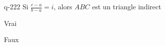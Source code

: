\begin{truefalse}{q-222}
Si $\frac{c-a}{b-a} =i$, alors $ABC$ est un triangle indirect
\item Vrai
\item* Faux
\end{truefalse}

